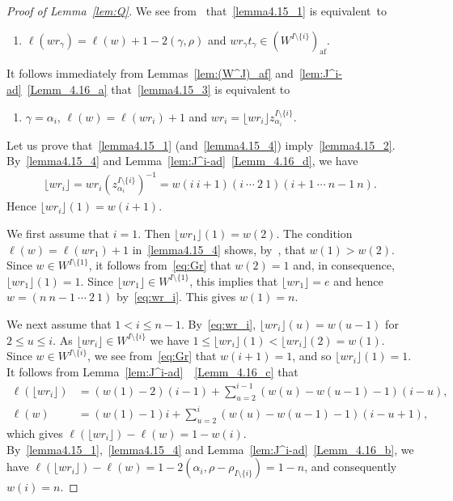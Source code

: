 \documentclass[10pt]{amsart}
\theoremstyle{definition}\newtheorem{defi}[theo]{Definition}
\theoremstyle{remark}\newtheorem{rema}[theo]{Remark}
\DeclareMathOperator{\af}{af}
\begin{document}
\begin{proof}[Proof of Lemma~\ref{lem:Q}]
We see from~\cite[Proof of Theorem~10.16]{LS} 
that~\ref{lemma4.15_1} is equivalent~to 
\begin{enumerate}[label=(\arabic*),resume*=lemma4.15]
\item\label{lemma4.15_3} %
$\ell(w r_{\gamma}) = \ell(w) + 1 - 2(\gamma,\rho)$
and
$w r_{\gamma}t_{\gamma} \in (W^{I \setminus \{ i \}})_{\af}$.
\end{enumerate}
It follows immediately from Lemmas~\ref{lem:(W^J)_af} 
and~\ref{lem:J^i-ad}~\ref{Lemm_4.16_a} 
that~\ref{lemma4.15_3} is equivalent to 
\begin{enumerate}[label=(\arabic*),resume*=lemma4.15]
\item\label{lemma4.15_4} %
$\gamma = \alpha_i$, 
$\ell(w) = \ell(w r_i) + 1$ 
and
$w r_i = \lfloor w r_i \rfloor z_{\alpha_i}^{I \setminus \{ i \}}$.
\end{enumerate}

Let us prove that~\ref{lemma4.15_1} (and~\ref{lemma4.15_4}) imply~\ref{lemma4.15_2}. 
By~\ref{lemma4.15_4} and Lemma~\ref{lem:J^i-ad}~\ref{Lemm_4.16_d}, 
we have
\begin{align} \label{eq:wr_i}
\lfloor w r_i \rfloor = w r_i (z_{\alpha_i}^{I \setminus \{ i \}})^{-1} 
= w(i \ i+1)(i \ \cdots \ 2 \ 1)(i+1 \ \cdots \ n-1 \ n) .
\end{align}
Hence 
$\lfloor w r_i \rfloor (1) = w(i+1)$.

We first assume that $i=1$. 
Then 
$\lfloor w r_1 \rfloor (1) = w(2)$. 
The condition 
$\ell(w) = \ell(w r_1) + 1$ in~\ref{lemma4.15_4}
shows, 
by~\cite[Proposition~1.5.3]{BB}, 
that 
$w(1) > w(2)$. 
Since $w \in W^{I \setminus \{ 1 \}}$, 
it follows from~\eqref{eq:Gr} that 
$w(2) = 1$ 
and, in consequence, 
$\lfloor w r_1 \rfloor (1) = 1$. 
Since 
$\lfloor w r_1 \rfloor \in W^{I \setminus \{ 1 \}}$, 
this implies that 
$\lfloor w r_1 \rfloor = e$ 
and hence 
$w = (n \ n-1 \ \cdots \ 2 \ 1)$ 
by~\eqref{eq:wr_i}. 
This gives 
$w(1) = n$. 

We next assume that 
$1 < i \leq n-1$. 
By~\eqref{eq:wr_i}, 
$\lfloor w r_i \rfloor (u) = w(u-1)$ 
for $2 \leq u \leq i$.
As 
$\lfloor wr_i \rfloor \in W^{I \setminus \{ i \}}$ 
we have
$1 \leq \lfloor wr_i \rfloor (1) < \lfloor wr_i \rfloor (2) = w(1)$. 
Since $w \in W^{I \setminus \{ i \}}$, 
we see from~\eqref{eq:Gr} that 
$w(i+1) = 1$, 
and so 
$\lfloor w r_i \rfloor (1) = 1$. 
It follows from Lemma~\ref{lem:J^i-ad}~~\ref{Lemm_4.16_c} that 
\begin{align}
\ell(\lfloor w r_i \rfloor) 
&= 
(w(1) - 2)(i-1) + \sum_{u=2}^{i-1} \left( w(u) - w(u-1) - 1 \right) (i-u), \\[2mm]
\ell(w) 
&= 
(w(1) - 1)i + \sum_{u=2}^i \left( w(u) - w(u-1) - 1 \right) (i-u+1) ,
\end{align}
which gives 
$\ell(\lfloor w r_i \rfloor) - \ell(w) = 1 - w(i)$. 
By~\ref{lemma4.15_1},~\ref{lemma4.15_4} and Lemma~\ref{lem:J^i-ad}~\ref{Lemm_4.16_b}, 
we have 
$\ell(\lfloor w r_i \rfloor) - \ell(w) = 1 - 2(\alpha_i, \rho-\rho_{I \setminus \{ i \}}) = 1-n$, 
and consequently $w(i) = n$. 


\end{proof}
\end{document}
